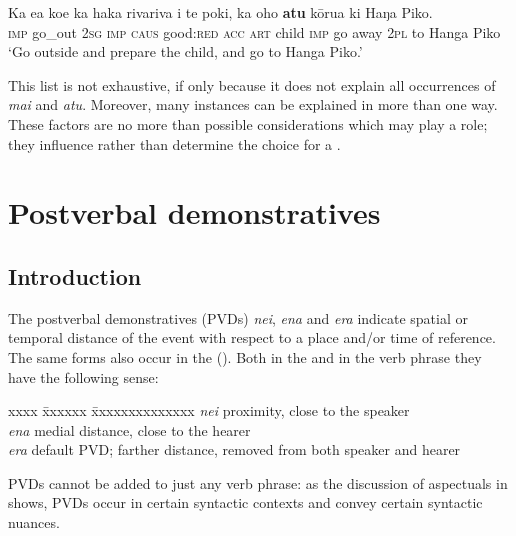 \ea\label{ex:7.153}
\gll Ka e{\ꞌ}a koe ka haka rivariva i te poki, ka oho \textbf{atu} kōrua ki Haŋa Piko. \\
\textsc{imp} go\_out \textsc{2sg} \textsc{imp} \textsc{caus} good:\textsc{red} \textsc{acc} \textsc{art} child \textsc{imp} go away \textsc{2pl} to Hanga Piko \\

\glt 
‘Go outside and prepare the child, and go to Hanga Piko.’ \textstyleExampleref{[R210.036]} 
\z

This list is not exhaustive, if only because it does not explain all occurrences of \textit{mai} and \textit{atu}. Moreover, many instances can be explained in more than one way. These factors are no more than possible considerations which may play a role; they influence rather than determine the choice for a .
\section{Postverbal demonstratives}\label{sec:7.6}
\subsection{Introduction}\label{sec:7.6.1}

The postverbal demonstratives (PVDs) \textit{nei}, \textit{ena} and \textit{era} indicate spatial or temporal distance of the event with respect to a place and/or time of reference. The same forms also occur in the  (). Both in the  and in the verb phrase they have the following sense:

\begin{tabbing}
xxxx \= xxxxxx \= xxxxxxxxxxxxxx\kill
\> \textit{nei}\>  proximity, close to the speaker\\
\> \textit{ena} \> medial distance, close to the hearer\\
\> \textit{era} \> default PVD; farther distance, removed from both speaker and hearer
\end{tabbing}

PVDs cannot be added to just any verb phrase: as the discussion of aspectuals in  shows, PVDs occur in certain syntactic contexts and convey certain syntactic nuances.

